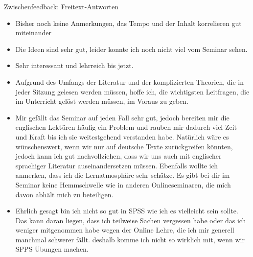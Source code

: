 \documentclass[11pt]{beamer}
\begin{document}
\begin{frame}{Zwischenfeedback: Freitext-Antworten}
\scriptsize
\begin{itemize}
	\item Bisher noch keine Anmerkungen, das Tempo und der Inhalt korrelieren gut miteinander
	\item Die Ideen sind sehr gut, leider konnte ich noch nicht viel vom Seminar sehen.
	\item Sehr interessant und lehrreich bis jetzt.
	 \item Aufgrund des Umfangs der Literatur und der komplizierten Theorien, die in jeder Sitzung gelesen werden müssen, hoffe ich, die wichtigsten Leitfragen, die im Unterricht gelöst werden müssen, im Voraus zu geben.
	 \item Mir gefällt das Seminar auf jeden Fall sehr gut, jedoch bereiten mir die englischen Lektüren häufig ein Problem und rauben mir dadurch viel Zeit und Kraft bis ich sie weitestgehend verstanden habe. Natürlich wäre es wünschenswert, wenn wir nur auf deutsche Texte zurückgreifen könnten, jedoch kann ich gut nachvollziehen, dass wir uns auch mit englischer sprachiger Literatur auseinandersetzen müssen. Ebenfalls wollte ich anmerken, dass ich die Lernatmosphäre sehr schätze. Es gibt bei dir im Seminar keine Hemmschwelle wie in anderen Onlineseminaren, die mich davon abhält mich zu beteiligen.
	 \item Ehrlich gesagt bin ich nicht so gut in SPSS wie ich es vielleicht sein sollte. Das kann daran liegen, dass ich teilweise Sachen vergessen habe oder das ich weniger mitgenommen habe wegen der Online Lehre, die ich mir generell manchmal schwerer fällt. deshalb komme ich nicht so wirklich mit, wenn wir SPPS Übungen machen.
\end{itemize}
\end{frame}

%
\end{document}
